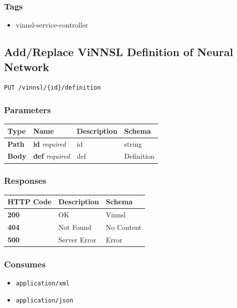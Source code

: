 \subsubsection{Tags}\label{tags-5}

\begin{itemize}
\tightlist
\item
  vinnsl-service-controller
\end{itemize}

\subsection{Add/Replace ViNNSL Definition of Neural
Network}\label{addreplace-vinnsl-definition-of-neural-network}

\begin{verbatim}
PUT /vinnsl/{id}/definition
\end{verbatim}

\subsubsection{Parameters}\label{parameters-5}

\begin{longtable}[]{@{}llll@{}}
\toprule
Type & Name & Description & Schema\tabularnewline
\midrule
\endhead
\textbf{Path} & \textbf{id} \emph{required} & id & string\tabularnewline
\textbf{Body} & \textbf{def} \emph{required} & def &
Definition\tabularnewline
\bottomrule
\end{longtable}

\subsubsection{Responses}\label{responses-6}

\begin{longtable}[]{@{}lll@{}}
\toprule
HTTP Code & Description & Schema\tabularnewline
\midrule
\endhead
\textbf{200} & OK & Vinnsl\tabularnewline
\textbf{404} & Not Found & No Content\tabularnewline
\textbf{500} & Server Error & Error\tabularnewline
\bottomrule
\end{longtable}

\subsubsection{Consumes}\label{consumes-2}

\begin{itemize}
\tightlist
\item
  \texttt{application/xml}
\item
  \texttt{application/json}
\end{itemize}

